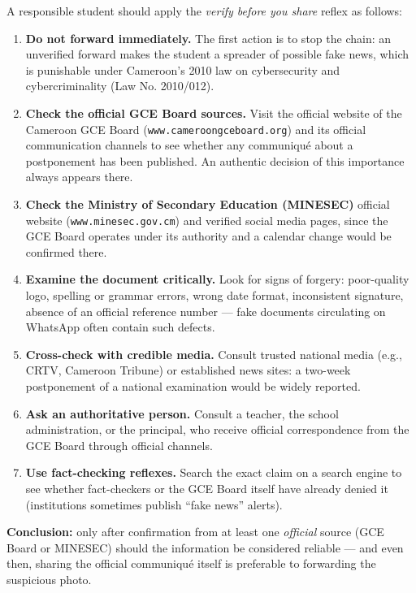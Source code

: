 \documentclass[11pt]{article}
\begin{document}
\begin{corrige}
A responsible student should apply the \emph{verify before you share} reflex as follows:
\begin{enumerate}
    \item \textbf{Do not forward immediately.} The first action is to stop the chain: an unverified forward makes the student a spreader of possible fake news, which is punishable under Cameroon's 2010 law on cybersecurity and cybercriminality (Law No. 2010/012).
    \item \textbf{Check the official GCE Board sources.} Visit the official website of the Cameroon GCE Board (\texttt{www.cameroongceboard.org}) and its official communication channels to see whether any communiqué about a postponement has been published. An authentic decision of this importance always appears there.
    \item \textbf{Check the Ministry of Secondary Education (MINESEC)} official website (\texttt{www.minesec.gov.cm}) and verified social media pages, since the GCE Board operates under its authority and a calendar change would be confirmed there.
    \item \textbf{Examine the document critically.} Look for signs of forgery: poor-quality logo, spelling or grammar errors, wrong date format, inconsistent signature, absence of an official reference number — fake documents circulating on WhatsApp often contain such defects.
    \item \textbf{Cross-check with credible media.} Consult trusted national media (e.g., CRTV, Cameroon Tribune) or established news sites: a two-week postponement of a national examination would be widely reported.
    \item \textbf{Ask an authoritative person.} Consult a teacher, the school administration, or the principal, who receive official correspondence from the GCE Board through official channels.
    \item \textbf{Use fact-checking reflexes.} Search the exact claim on a search engine to see whether fact-checkers or the GCE Board itself have already denied it (institutions sometimes publish ``fake news'' alerts).
\end{enumerate}
\textbf{Conclusion:} only after confirmation from at least one \emph{official} source (GCE Board or MINESEC) should the information be considered reliable — and even then, sharing the official communiqué itself is preferable to forwarding the suspicious photo.
\end{corrige}
\end{document}
